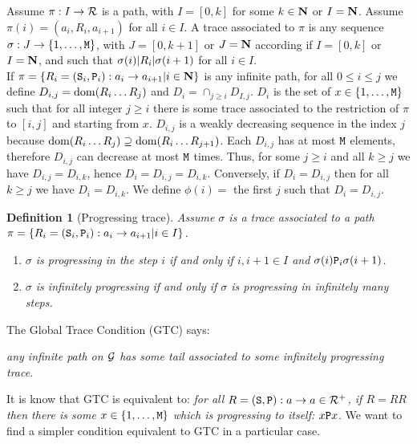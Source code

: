 \documentclass{lmcs}
\newtheorem{definition}[theorem]{Definition}
\begin{document}
Assume $\pi: I \rightarrow {\mathcal R}$ is a path, with  $I=[0,k]$ for some $k \in {\bf N}$ or $I={\bf N}$.
Assume $\pi(i)=(a_i,R_i,a_{i+1})$ for all $i \in I$. A trace associated to $\pi$
is any sequence $\sigma : J \rightarrow \{1, \ldots, {\tt M}\}$, with $J=[0,k+1]$ or $J={\bf N}$ according
if $I=[0,k]$ or $I={\bf N}$,
and such that $\sigma(i) {| R_i |} \sigma(i+1)$ for all $i \in I$. 
\\

If $\pi = \{ R_i = ({\tt S}_i,{\tt P}_i):a_i \rightarrow a_{i+1} | i \in {\bf N}\} $ is any infinite path, for all $0 \le i \le j$ we define $D_{i,j} = {\rm dom}(R_i \ldots R_j)$ and $D_{i} = \cap_{j \ge i} D_{I,j}$. $D_i$ is the set of $x \in \{1, \ldots, {\tt M}\}$ such that for all integer $j \ge i$ there is some trace associated to the restriction of $\pi$ to $[i,j]$ and starting from $x$. $D_{i,j}$ is a weakly decreasing sequence in the index $j$ because ${\rm dom}(R_i \ldots R_j) \supseteq {\rm dom}(R_i \ldots R_{j+1})$. Each $D_{i,j}$ has at most ${\tt M}$ elements, therefore $D_{i,j}$  can decrease at most ${\tt M}$ times. Thus, for some $j \ge i$ and all $k \ge j$ we have $D_{i,j} = D_{i,k}$, hence $D_i = D_{i,j} = D_{i,k}$. Conversely, if $D_i = D_{i,j}$ then for all $k \ge j$ we have $D_i = D_{i,k}$. We define $\phi(i) = $ the first $j$ such that $D_i = D_{i,j}$.
\\

\begin{definition}[Progressing trace]
\label{definition-progressing-trace}
Assume $\sigma$ is a trace associated to a path $\pi = \{ R_i = ({\tt S}_i,{\tt P}_i):a_i \rightarrow a_{i+1} | i \in I\} $.
\begin{enumerate}
\item
$\sigma$ is progressing in the step $i$ if and only if  $i, i+1 \in I$ and $\sigma(i) {\tt P}_i \sigma(i+1)$. \item
$\sigma$ is infinitely progressing if and only if $\sigma$ is progressing in infinitely many steps.  
\end{enumerate}
\end{definition}

The Global Trace Condition (GTC) says: 

\begin{center}
\emph{any infinite path on ${\mathcal G}$ has some tail associated to some infinitely progressing trace}. 
\end{center}

It is know that GTC is equivalent to: \emph{for all $R = ({\tt S},{\tt P}) : a \rightarrow a \in {\mathcal R}^+$, if $R=RR$ then there is some $x \in \{1, \ldots, {\tt M}\}$ which is progressing to itself: $x {\tt P} x$}. We want to find a simpler condition equivalent to GTC in a particular case.
\end{document}
